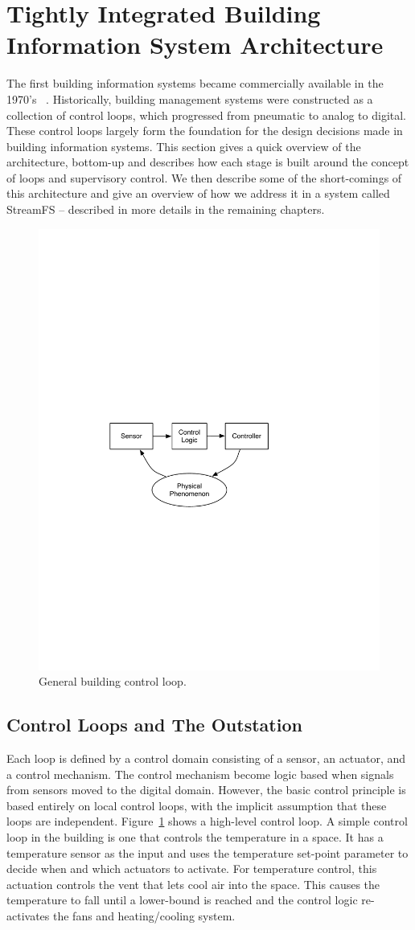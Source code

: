 \section{Tightly Integrated Building Information System Architecture}

The first building information systems became commercially available in the 1970's ~\cite{gardner1987energy}.  
Historically, building management 
systems were constructed as a collection of control loops, which progressed from pneumatic to analog to digital.
These control loops largely form the foundation for the design decisions made in building information systems.  
This section gives a quick overview of the architecture, bottom-up and describes how each stage is built around
the concept of loops and supervisory control.  We then describe some of the short-comings of this architecture
and give an overview of how we address it in a system called StreamFS -- described in more details in
the remaining chapters.

\begin{figure}[t!] %
\centering
\includegraphics[width=0.50\columnwidth]{figs/control_loop}
\caption{General building control loop.}
\label{fig:control_loop}
\end{figure}

\subsection{Control Loops and The Outstation}
\label{sec:control_loops}
Each loop is defined by a control domain consisting of a sensor, an actuator, and a control mechanism.  The control mechanism
become logic based when signals from sensors moved to the digital domain.  However, the basic control principle is based
entirely on local control loops, with the implicit assumption that these loops are independent.
Figure~\ref{fig:control_loop} shows a high-level control loop.  A simple control loop in the building is one that controls
the temperature in a space.  It has a temperature sensor as the input and uses the temperature set-point parameter to 
decide when and which actuators to activate.
For temperature control, this actuation controls the vent that lets cool air into the space.  This causes the temperature
to fall until a lower-bound is reached and the control logic re-activates the fans and heating/cooling system.


